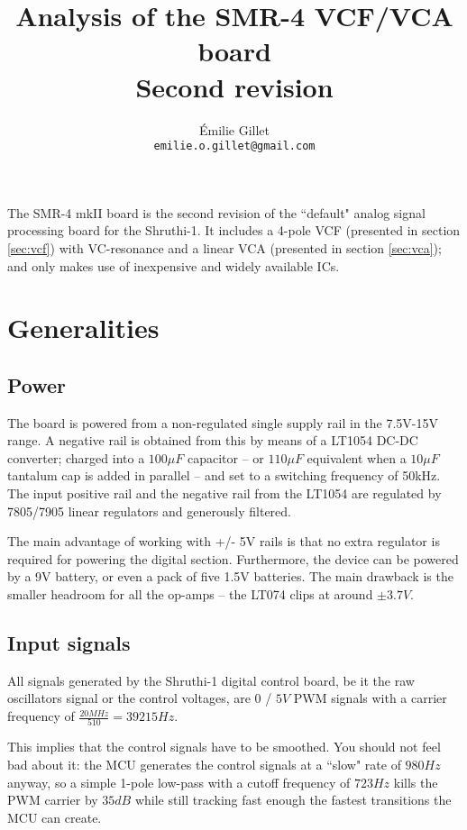 \documentclass[a4paper,11pt]{article}
\title{Analysis of the SMR-4 VCF/VCA board\\Second revision}
\author{Émilie Gillet \\ \tt emilie.o.gillet@gmail.com}
\date{}
\begin{document}
\maketitle

The SMR-4 mkII board is the second revision of the ``default" analog signal processing board for the  Shruthi-1. It includes a 4-pole VCF (presented in section \ref{sec:vcf}) with VC-resonance and a linear VCA (presented in section \ref{sec:vca}); and only makes use of inexpensive and widely available ICs.

\section{Generalities}

\subsection{Power}

The board is powered from a non-regulated single supply rail in the 7.5V-15V range. A negative rail is obtained from this by means of a LT1054 DC-DC converter; charged into a $100\mu F$ capacitor -- or $110\mu F$ equivalent when a $10\mu F$ tantalum cap is added in parallel -- and set to a switching frequency of 50kHz. The input positive rail and the negative rail from the LT1054 are regulated by 7805/7905 linear regulators and generously filtered.

The main advantage of working with +/- 5V rails is that no extra regulator is required for powering the digital section. Furthermore, the device can be powered by a 9V battery, or even a pack of five 1.5V batteries. The main drawback is the smaller headroom for all the op-amps -- the LT074 clips at around $\pm 3.7V$.

\subsection{Input signals}

All signals generated by the Shruthi-1 digital control board, be it the raw oscillators signal or the control voltages, are $0$ / $5V$ PWM signals with a carrier frequency of $\frac{20MHz}{510} = 39215 Hz$.

This implies that the control signals have to be smoothed. You should not feel bad about it: the MCU generates the control signals at a ``slow" rate of $980 Hz$ anyway, so a simple 1-pole low-pass with a cutoff frequency of $723 Hz$ kills the PWM carrier by $35dB$ while still tracking fast enough the fastest transitions the MCU can create.
\end{document}

